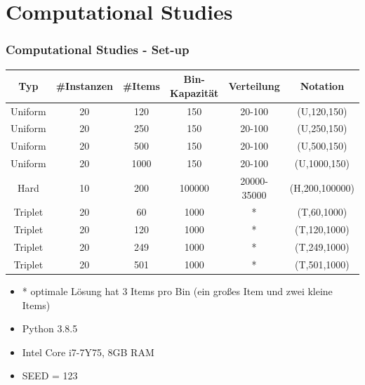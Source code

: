 \documentclass{beamer}
\begin{document}
%
\section{Computational Studies}
\begin{frame}
\frametitle{Computational Studies - Set-up}

\begin{table}
\begin{footnotesize}
\begin{tabular}{c c c c c c}
\toprule
\textbf{Typ} & \textbf{\#Instanzen} & \textbf{\#Items} & \textbf{Bin-Kapazität} & \textbf{Verteilung} & \textbf{Notation}\\
\midrule
Uniform  & 20   & 120 & 150 & 20-100 & (U,120,150) \\
Uniform  & 20   & 250 & 150 & 20-100 & (U,250,150) \\
Uniform  & 20   & 500 & 150 & 20-100 & (U,500,150) \\
Uniform  & 20   & 1000 & 150 & 20-100 & (U,1000,150) \\\midrule
Hard  & 10   & 200 & 100000 & 20000-35000 & (H,200,100000) \\\midrule
Triplet  & 20   & 60 & 1000 & * & (T,60,1000) \\
Triplet  & 20   & 120 & 1000 & * & (T,120,1000) \\
Triplet  & 20   & 249 & 1000 & * & (T,249,1000) \\
Triplet  & 20   & 501 & 1000 & * & (T,501,1000) \\
\bottomrule
\end{tabular}
\end{footnotesize}
\end{table}
\begin{footnotesize}
\begin{itemize}
\item * optimale Lösung hat 3 Items pro Bin (ein großes Item und zwei kleine Items)
\item Python 3.8.5
\item Intel Core i7-7Y75, 8GB RAM
\item SEED = 123
\end{itemize}
\end{footnotesize}

\end{frame}
\end{document}
